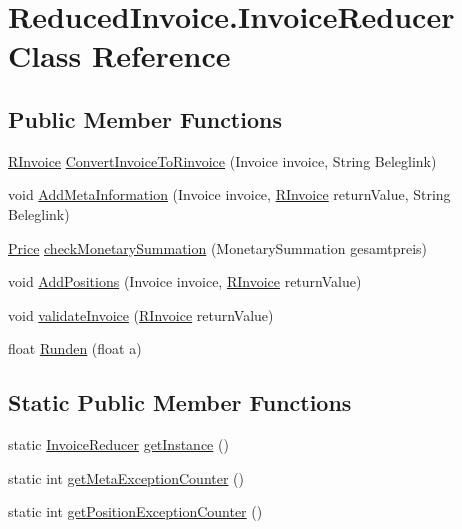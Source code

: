\hypertarget{class_reduced_invoice_1_1_invoice_reducer}{\section{Reduced\-Invoice.\-Invoice\-Reducer Class Reference}
\label{class_reduced_invoice_1_1_invoice_reducer}
}
\subsection*{Public Member Functions}
\begin{DoxyCompactItemize}
\item 
\hyperlink{class_reduced_invoice_1_1_r_invoice}{R\-Invoice} \hyperlink{class_reduced_invoice_1_1_invoice_reducer_ad568f2f09dfbdf8fc59a0a8bed9cac1c}{Convert\-Invoice\-To\-Rinvoice} (Invoice invoice, String Beleglink)
\item 
void \hyperlink{class_reduced_invoice_1_1_invoice_reducer_a22a3a25f59d72d785550054199c9bea9}{Add\-Meta\-Information} (Invoice invoice, \hyperlink{class_reduced_invoice_1_1_r_invoice}{R\-Invoice} return\-Value, String Beleglink)
\item 
\hyperlink{class_reduced_invoice_1_1_price}{Price} \hyperlink{class_reduced_invoice_1_1_invoice_reducer_a6caff41f142502c44cbeefc7b1e44c9d}{check\-Monetary\-Summation} (Monetary\-Summation gesamtpreis)
\item 
void \hyperlink{class_reduced_invoice_1_1_invoice_reducer_a599dbd87601635791534a8624cb8f953}{Add\-Positions} (Invoice invoice, \hyperlink{class_reduced_invoice_1_1_r_invoice}{R\-Invoice} return\-Value)
\item 
void \hyperlink{class_reduced_invoice_1_1_invoice_reducer_a47e121912714be2caea8d2619c10a2f0}{validate\-Invoice} (\hyperlink{class_reduced_invoice_1_1_r_invoice}{R\-Invoice} return\-Value)
\item 
float \hyperlink{class_reduced_invoice_1_1_invoice_reducer_a4d9155f5cc7223ed2659a8567f9ba1ec}{Runden} (float a)
\end{DoxyCompactItemize}
\subsection*{Static Public Member Functions}
\begin{DoxyCompactItemize}
\item 
static \hyperlink{class_reduced_invoice_1_1_invoice_reducer}{Invoice\-Reducer} \hyperlink{class_reduced_invoice_1_1_invoice_reducer_ad4fafc7b331a78ef243c3e3ba88803da}{get\-Instance} ()
\item 
static int \hyperlink{class_reduced_invoice_1_1_invoice_reducer_a987de6f3876284a7b456240f85dc066f}{get\-Meta\-Exception\-Counter} ()
\item 
static int \hyperlink{class_reduced_invoice_1_1_invoice_reducer_ad5034d72d8eae0edc2026c9ca9e66465}{get\-Position\-Exception\-Counter} ()
\end{DoxyCompactItemize}


